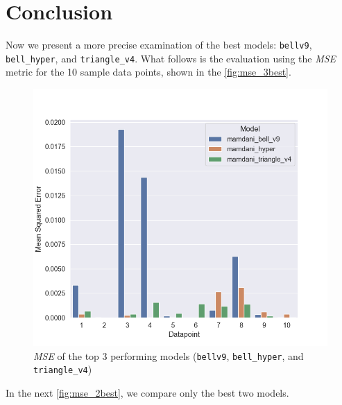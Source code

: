 \documentclass[titlepage]{article}
\begin{document}
\section{Conclusion}

Now we present a more precise examination of the best models: \texttt{bellv9}, \texttt{bell\_hyper}, and \texttt{triangle\_v4}.
What follows is the evaluation using the \emph{MSE} metric for the 10 sample data points, shown in the \vref{fig:mse_3best}.

\begin{figure}[H]
\centering
\includegraphics[scale=0.4]{../images/eval_models/mse_3best}
\caption{\emph{MSE} of the top 3 performing models (\texttt{bellv9}, \texttt{bell\_hyper}, and \texttt{triangle\_v4})}
\label{fig:mse_3best}
\end{figure}

In the next \cref{fig:mse_2best}, we compare only the best two models.
\end{document}
